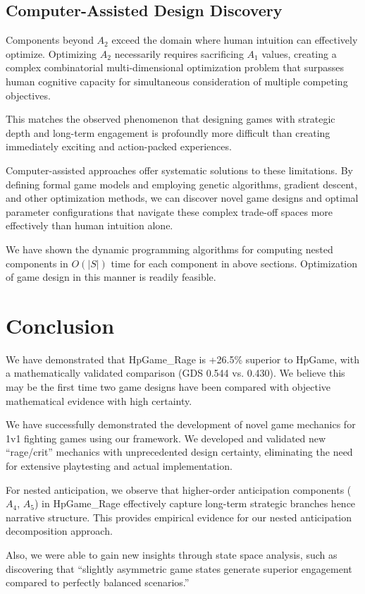 \documentclass[manuscript,review,anonymous]{acmart}
\theoremstyle{definition}
\theoremstyle{plain}
\begin{document}
\subsection{Computer-Assisted Design Discovery}
Components beyond $A_2$ exceed the domain where human intuition can effectively optimize.
Optimizing $A_2$ necessarily requires sacrificing $A_1$ values, creating a complex combinatorial multi-dimensional optimization problem that surpasses human cognitive capacity for simultaneous consideration of multiple competing objectives.

This matches the observed phenomenon that designing games with strategic depth and long-term engagement is profoundly more difficult than creating immediately exciting and action-packed experiences.

Computer-assisted approaches offer systematic solutions to these limitations.
By defining formal game models and employing genetic algorithms, gradient descent, and other optimization methods, we can discover novel game designs and optimal parameter configurations that navigate these complex trade-off spaces more effectively than human intuition alone.

We have shown the dynamic programming algorithms for computing nested components in $O(|S|)$ time for each component in above sections.
Optimization of game design in this manner is readily feasible.

\section{Conclusion}
We have demonstrated that HpGame\_Rage is +26.5\% superior to HpGame, with a mathematically validated comparison (GDS 0.544 vs. 0.430).
We believe this may be the first time two game designs have been compared with objective mathematical evidence with high certainty.

We have successfully demonstrated the development of novel game mechanics for 1v1 fighting games using our framework.
We developed and validated new ``rage/crit'' mechanics with unprecedented design certainty, eliminating the need for extensive playtesting and actual implementation.

For nested anticipation, we observe that higher-order anticipation components ($A_4$, $A_5$) in HpGame\_Rage effectively capture long-term strategic branches hence narrative structure.
This provides empirical evidence for our nested anticipation decomposition approach.

Also, we were able to gain new insights through state space analysis, such as discovering that ``slightly asymmetric game states generate superior engagement compared to perfectly balanced scenarios.''
\end{document}
